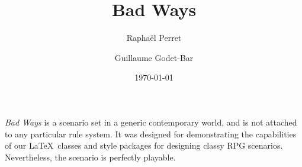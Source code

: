 \documentclass{rpg_scenario}
\title{Bad Ways}
\date{\today}
\begin{document}
\author{Rapha\"el Perret \and Guillaume Godet-Bar}
\maketitle


\textit{Bad Ways} is a scenario set in a generic contemporary world, and is not
attached to any particular rule system. It was designed for demonstrating the
capabilities of our \LaTeX\ classes and style packages for designing classy RPG
scenarios. Nevertheless, the scenario is perfectly playable.




















\end{document}
